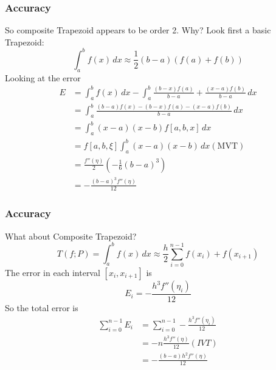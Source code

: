 \documentclass[10pt]{beamer}
\begin{document}
\begin{frame}
\frametitle{Accuracy}
So composite Trapezoid appears to be order 2.  Why?  Look first a basic Trapezoid:
\begin{equation*}
  \int_a^b f(x) \,dx \approx \frac{1}{2}(b-a)(f(a)+f(b))
\end{equation*}
Looking at the error 
\begin{align*}
  E &= \int_a^b f(x) \,dx - \int_a^b \frac{(b-x)f(a)}{b-a}+\frac{(x-a)f(b)}{b-a}\,dx\\
    &=\int_a^b \frac{(b-a)f(x) - (b-x)f(a) - (x-a)f(b)}{b-a}\,dx\\
    &=\int_a^b (x-a)(x-b)f[a,b,x]\,dx\\
    &=f[a,b,\xi]\int_a^b (x-a)(x-b)\,dx ( \text{MVT})\\
    &=\frac{f''(\eta)}{2}\left(-\frac{1}{6}(b-a)^3\right)\\
    &=-\frac{(b-a)^3 f''(\eta)}{12}
\end{align*}
\end{frame}
\begin{frame}
\frametitle{Accuracy}
What about Composite Trapezoid?
\begin{equation*}
T(f;P) = \int_a^b f(x)\,dx \approx \frac{h}{2}\sum_{i=0}^{n-1}f(x_i)+f(x_{i+1})
\end{equation*}
The error in each interval $[x_i,x_{i+1}]$ is
\begin{equation*}
E_i =-\frac{h^3 f''(\eta_i)}{12}
\end{equation*}
So the total error is
\begin{align*}
\sum_{i=0}^{n-1} E_i & = \sum_{i=0}^{n-1}  -\frac{h^3 f''(\eta_i)}{12}\\
& = -n\frac{h^3 f''(\eta)}{12} (IVT)\\
& = -\frac{(b-a) h^2 f''(\eta)}{12}
\end{align*}
\end{frame}
\end{document}
